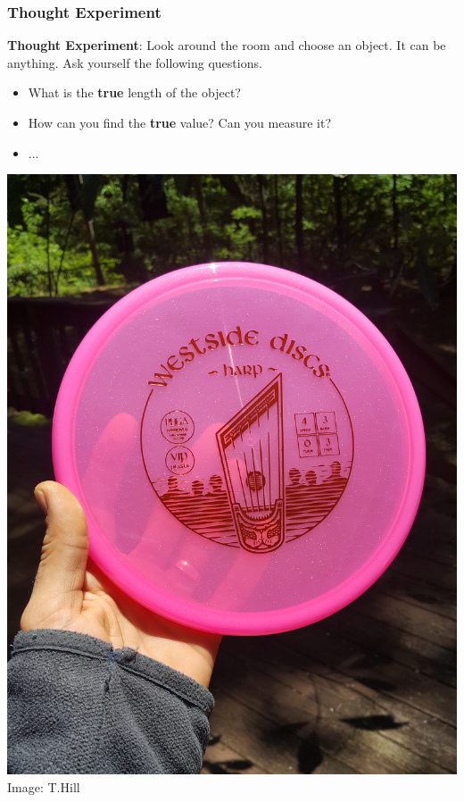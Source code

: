 \documentclass[fleqn]{beamer} %
\newcommand{\sectiontitleI}{Thought Experiment}
\begin{document}
\begin{frame}[label=sectionI]
\frametitle{\sectiontitleI}

{\bf Thought Experiment}: Look around the room and choose an object. It can be anything. Ask yourself the following questions. \vspc
\begin{itemize}
\item What is the {\bf\GR true} length of the object? \vspc
\item How can you find the {\bf\GR true} value? Can you measure it? \vspc
\item ...
\end{itemize}

\includegraphics[scale=.025,angle=-90,origin=c]{vip_harp.jpg}
{\tiny Image: T.Hill}
\end{frame}


\end{document}
